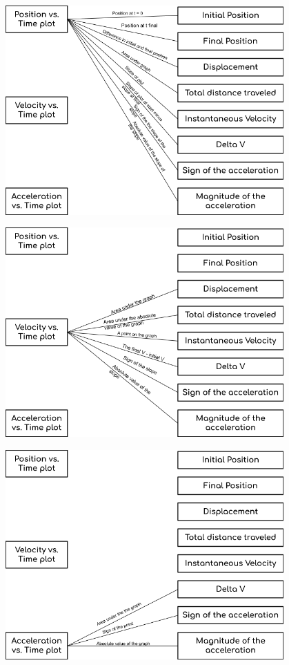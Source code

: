     \begin{mdframed}
        \centering
        \includegraphics[width=0.8\textwidth]{image13.png}

        \horizontal

        \includegraphics[width=0.8\textwidth]{image14.png}

        \horizontal

        \includegraphics[width=0.8\textwidth]{image24.png}
    \end{mdframed}

